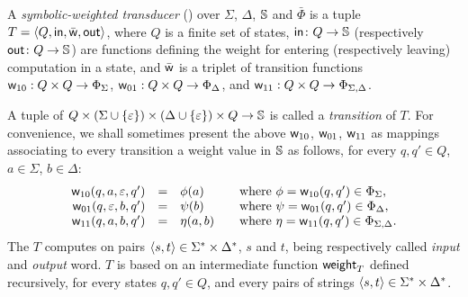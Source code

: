 \begin{definition}
\label{def:transducer} \label{def:SWT}
A \emph{symbolic-weighted transducer} (\SWT)
over $\Sigma$, $\Delta$, $\mathbb{S}$ and $\bar\Phi$
is a tuple
$T = \< Q, \init, \bar{\wei}, \final >$,
where $Q$ is a finite set of states,
$\mathsf{in} \colon Q \to \mathbb{S}$   %
(respectively $\mathsf{out} \colon Q \to \mathbb{S}$)  %
are functions defining the weight for entering
(respectively leaving) computation in a state,
and $\bar{\mathsf{w}}$ is a triplet of transition functions
$\mathsf{w}_{10}: Q \times Q \to \Phi_{\Sigma}$,
$\mathsf{w}_{01}: Q \times Q \to \Phi_{\Delta}$, and
$\mathsf{w}_{11}: Q \times Q \to \Phi_{\Sigma, \Delta}$.
\end{definition}
%
\noindent
%
\noindent
A tuple of $Q \times (\Sigma \cup \{ \varepsilon \}) \times (\Delta \cup \{ \varepsilon \}) \times Q \to \mathbb{S}$
is called a \emph{transition} of $T$.
For convenience, we shall sometimes present the above $\mathsf{w}_{10}$, $\mathsf{w}_{01}$, $\mathsf{w}_{11}$
as mappings associating to every transition a weight value in $\mathbb{S}$ as follows,
for every $q, q' \in Q$, $a \in \Sigma$,  $b \in \Delta$:
\[
\begin{array}{rcll}
\wei_{10}(q, a, \varepsilon, q') & = & \phi(a) & %
\quad\mathrm{where~} \phi = \wei_{10}(q, q') \in \Phi_\Sigma,\\
\wei_{01}(q, \varepsilon, b, q') & = & \psi(b) &
\quad\mathrm{where~} \psi = \wei_{01}(q, q') \in \Phi_\Delta,\\
\wei_{11}(q, a, b, q') & = & \eta(a, b) &
\quad\mathrm{where~} \eta = \wei_{11}(q, q') \in \Phi_{\Sigma, \Delta}.\\
\end{array}
\]
%
\noindent
The \SWT $T$ computes on pairs $\< s, t> \in \Sigma^* \times \Delta^*$,
$s$ and $t$, being respectively called \emph{input} and \emph{output} word.
$T$ is
based on an intermediate function $\mathsf{weight}_T$
defined recursively, for every states $q, q' \in Q$,
and every pairs of strings $\< s, t> \in \Sigma^* \times \Delta^*$.
